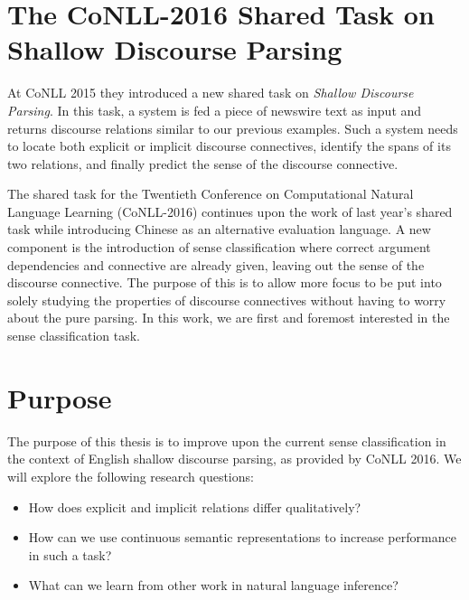 \section{The CoNLL-2016 Shared Task on Shallow Discourse Parsing}

At CoNLL 2015 they introduced a new shared task on \emph{Shallow Discourse Parsing}. In this task, a system is fed a piece of newswire text as input and returns discourse relations similar to our previous examples. Such a system needs to locate both explicit or implicit discourse connectives, identify the spans of its two relations, and finally predict the sense of the discourse connective.

The shared task for the Twentieth Conference on Computational Natural Language Learning (CoNLL-2016) continues upon the work of last year's shared task while introducing Chinese as an alternative evaluation language. A new component is the introduction of sense classification where correct argument dependencies and connective are already given, leaving out the sense of the discourse connective. The purpose of this is to allow more focus to be put into solely studying the properties of discourse connectives without having to worry about the pure parsing. In this work, we are first and foremost interested in the sense classification task.

\section{Purpose}

The purpose of this thesis is to improve upon the current sense classification in the context of English shallow discourse parsing, as provided by CoNLL 2016. We will explore the following research questions:

\begin{itemize}
    \item How does explicit and implicit relations differ qualitatively?
    \item How can we use continuous semantic representations to increase performance in such a task?
    \item What can we learn from other work in natural language inference?
\end{itemize}
